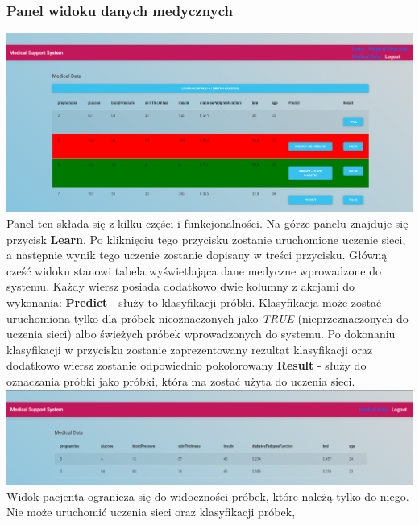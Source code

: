 \documentclass[12pt,a4paper]{article}
\begin{document}
    \subsubsection*{Panel widoku danych medycznych}
    \includegraphics[width=\textwidth,height=\textheight,keepaspectratio]{view_medical_data.png}
    \newline
    Panel ten składa się z kilku części i funkcjonalności. \newline
    Na górze panelu znajduje się przycisk \textbf{Learn}. Po kliknięciu tego przycisku zostanie uruchomione uczenie sieci, a następnie wynik tego uczenie zostanie dopisany w treści przycisku.\newline
    Główną cześć widoku stanowi tabela wyświetlająca dane medyczne wprowadzone do systemu. Każdy wiersz posiada dodatkowo dwie kolumny z akcjami do wykonania:\newline
    \textbf{Predict} - służy to klasyfikacji próbki. Klasyfikacja może zostać uruchomiona tylko dla próbek nieoznaczonych jako \textit{TRUE} (nieprzeznaczonych do uczenia sieci) albo świeżych próbek wprowadzonych do systemu. Po dokonaniu klasyfikacji w przycisku zostanie zaprezentowany rezultat klasyfikacji oraz dodatkowo wiersz zostanie odpowiednio pokolorowany\newline
    \textbf{Result} - służy do oznaczania próbki jako próbki, która ma zostać użyta do uczenia sieci.
    \newline \newline
    \includegraphics[width=\textwidth,height=\textheight,keepaspectratio]{view_medical_data_patient.png} \newline
    Widok pacjenta ogranicza się do widoczności próbek, które należą tylko do niego. Nie może uruchomić uczenia sieci oraz klasyfikacji próbek,
    
\end{document}
